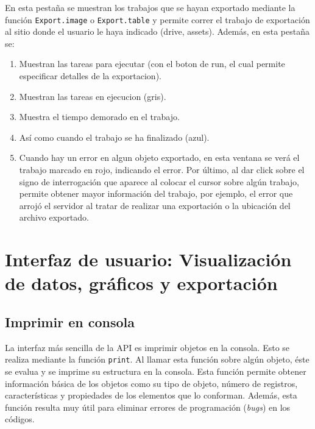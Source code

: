 \documentclass[
]{article}
\providecommand{\tightlist}{%
  \setlength{\itemsep}{0pt}\setlength{\parskip}{0pt}}
\begin{document}
En esta pestaña se muestran los trabajos que se hayan exportado mediante
la función \texttt{Export.image} o \texttt{Export.table} y permite
correr el trabajo de exportación al sitio donde el usuario le haya
indicado (drive, assets). Además, en esta pestaña se:

\begin{enumerate}
\def\labelenumi{\arabic{enumi}.}
\tightlist
\item
  Muestran las tareas para ejecutar (con el boton de run, el cual
  permite especificar detalles de la exportacion).
\item
  Muestran las tareas en ejecucion (gris).
\item
  Muestra el tiempo demorado en el trabajo.
\item
  Así como cuando el trabajo se ha finalizado (azul).
\item
  Cuando hay un error en algun objeto exportado, en esta ventana se verá
  el trabajo marcado en rojo, indicando el error. Por último, al dar
  click sobre el signo de interrogación que aparece al colocar el cursor
  sobre algún trabajo, permite obtener mayor información del trabajo,
  por ejemplo, el error que arrojó el servidor al tratar de realizar una
  exportación o la ubicación del archivo exportado.
\end{enumerate}

\newpage

\hypertarget{interfaz-de-usuario-visualizaciuxf3n-de-datos-gruxe1ficos-y-exportaciuxf3n}{%
\section{Interfaz de usuario: Visualización de datos, gráficos y
exportación}\label{interfaz-de-usuario-visualizaciuxf3n-de-datos-gruxe1ficos-y-exportaciuxf3n}}

\hypertarget{imprimir-en-consola}{%
\subsection{Imprimir en consola}\label{imprimir-en-consola}}

La interfaz más sencilla de la API es imprimir objetos en la consola.
Esto se realiza mediante la función \texttt{print}. Al llamar esta
función sobre algún objeto, éste se evalua y se imprime su estructura en
la consola. Esta función permite obtener información básica de los
objetos como su tipo de objeto, número de registros, características y
propiedades de los elementos que lo conforman. Además, esta función
resulta muy útil para eliminar errores de programación (\emph{bugs}) en
los códigos.
\end{document}
